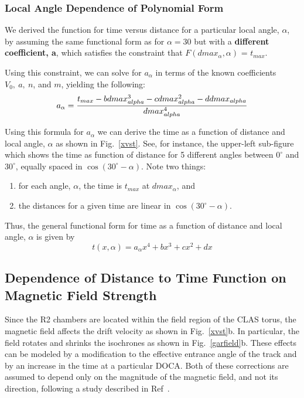 \subsubsection{Local Angle Dependence of Polynomial Form}
We derived the function for time versus distance for a particular local angle, $\alpha$, by
assuming the same functional form as for $\alpha = 30$ but with a {\bf different coefficient, a}, which 
satisfies the constraint that  $F(dmax_{\alpha},\alpha)$ = $t_{max}$.

Using this constraint, we can solve for $a_{\alpha}$ in terms of the known coefficients $V_0, ~a, ~n$, and $m$,
yielding the following:
\begin{equation}
\label{aalphaequation}
a_{\alpha} = {{t_{max} - b dmax_{alpha}^3 - c dmax_{alpha}^2 - d dmax_{alpha}}\over{dmax_{alpha}^4}}
\end{equation}

Using this formula for $a_{\alpha}$ we can derive the time as a function of distance and local
angle, $\alpha$ as shown in Fig.~\ref{xvst}.  See, for instance, the upper-left sub-figure 
which shows the time as function of distance for 5 different angles between $0^{\circ}$ and 
$30^{\circ}$, equally spaced in $\cos \left(30^\circ-\alpha\right)$.  Note two things:
\begin{enumerate}
\item for each angle, $\alpha$, the time is $t_{max}$ at $dmax_{\alpha}$, and
\item the distances for a given time are linear in $\cos \left(30^\circ-\alpha\right)$.
\end{enumerate}

Thus, the general functional form for time as a function of distance and local angle, $\alpha$
is given by
\begin{equation}
\label{tfunctionofxandlocalangle}
t(x,\alpha) = a_{\alpha} x^4 + b x^3 + c x^2 + d x
\end{equation}




\subsection{Dependence of Distance to Time Function on Magnetic Field Strength}
Since the R2 chambers are located within the field region of the CLAS torus, the 
magnetic field affects the drift velocity as shown in 
Fig.~\ref{xvst}b.  In particular, the field rotates and shrinks the isochrones
as shown in Fig.~\ref{garfield}b.  These effects can be modeled by a 
modification to the effective entrance angle of the track and by an increase 
in the time at a particular DOCA.  Both of these corrections are assumed to depend only on the 
magnitude of the magnetic field, and not its direction, following a study 
described in Ref~\cite{MM-IEEE}.  

